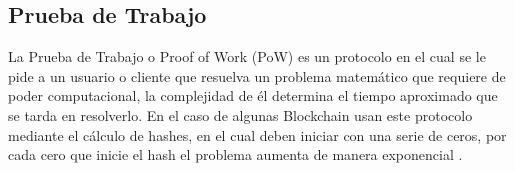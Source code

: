 \subsection{ Prueba de Trabajo} \label{sec:pow}

La Prueba de Trabajo o Proof of Work (PoW) es un protocolo en el cual se le pide a un usuario o cliente que resuelva
un problema matemático que requiere de poder computacional, la complejidad de él determina el tiempo aproximado que se tarda en resolverlo.
En el caso de algunas  Blockchain usan este protocolo mediante el cálculo de hashes, en el cual deben
iniciar con una serie de ceros, por cada cero que inicie el hash el problema aumenta de manera exponencial \cite[]{nakamoto_bitcoin_2008,vazquez_episodio_2020,back_hashcash_2002}.

